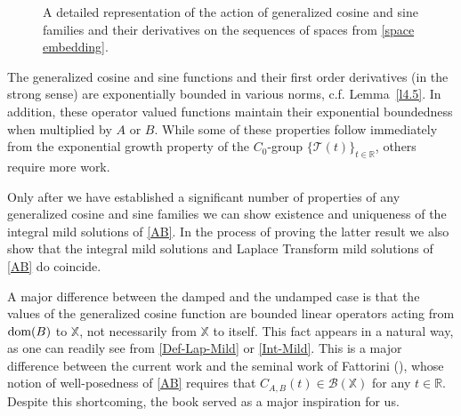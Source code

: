 \documentclass[11pt]{amsart}
\numberwithin{equation}{section}
\newcommand{\CAB}{C_{A,B}}
\newcommand{\RR}{{\mathbb R}}
\theoremstyle{remark}
\theoremstyle{definition}
\newcommand\cT{{\mathcal T}}
\newcommand\bX{{\mathbb X}}
\newcommand{\dom}{\text{\rm{dom}}}
\begin{document}
\begin{figure}[htbp]
\begin{center}
\end{center}
\caption{A detailed representation of the action of generalized cosine and sine families and their derivatives on the sequences of spaces from \eqref{space embedding}.}
\label{Spaces}
\end{figure}

The generalized cosine and sine functions and their first order derivatives (in the strong sense) are exponentially bounded in various norms, c.f. Lemma~\ref{l4.5}. In addition, these operator valued functions maintain their exponential boundedness when multiplied by $A$ or $B$. While some of these properties follow immediately from the exponential growth property of the $C_0$-group $\{\cT(t)\}_{t\in\RR}$, others require more work. 

Only after we have established a significant number of  properties of any generalized cosine and sine families we can show existence and uniqueness of the integral mild solutions of \eqref{AB}. In the process of proving the latter result we also show that the integral mild solutions and Laplace Transform mild solutions of \eqref{AB} do coincide. 

A major difference between the damped and the undamped case is that the values of the generalized cosine function are bounded linear operators acting from $\dom(B)$ to $\bX$, not necessarily from $\bX$ to itself. This fact appears in a natural way, as one can readily see from \eqref{Def-Lap-Mild} or \eqref{Int-Mild}. This is a major difference between the current work and the seminal work of Fattorini (\cite{Fa}), whose notion of well-posedness of \eqref{AB} requires that $\CAB(t)\in\mathcal{B}(\bX)$ for any $t\in\RR$. Despite this shortcoming, the book \cite{Fa} served as a major inspiration for us.
\end{document}
